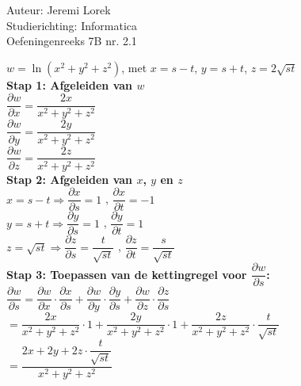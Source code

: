 \documentclass[a4paper]{article}
\begin{document}
\noindent \large Auteur: Jeremi Lorek\\
\noindent \large Studierichting: Informatica\\
\noindent \large Oefeningenreeks 7B nr. 2.1\\

\medskip
\normalsize

$w = \ln(x^2 + y^2 + z^2)$, met $x = s - t$, $y = s + t$, $z = 2\sqrt{st}$\\

\textbf{Stap 1: Afgeleiden van $w$}\\

$\dfrac{\partial w}{\partial x} = \dfrac{2x}{x^2 + y^2 + z^2}$\\

$\dfrac{\partial w}{\partial y} = \dfrac{2y}{x^2 + y^2 + z^2}$\\

$\dfrac{\partial w}{\partial z} = \dfrac{2z}{x^2 + y^2 + z^2}$\\

\textbf{Stap 2: Afgeleiden van $x$, $y$ en $z$}\\

$x = s - t \Rightarrow \dfrac{\partial x}{\partial s} = 1$ , $\dfrac{\partial x}{\partial t} = -1$\\

$y = s + t \Rightarrow \dfrac{\partial y}{\partial s} = 1$ , $\dfrac{\partial y}{\partial t} = 1$\\

$z = \sqrt{st} \Rightarrow \dfrac{\partial z}{\partial s} = \dfrac{t}{\sqrt{st}}$ , $\dfrac{\partial z}{\partial t} = \dfrac{s}{\sqrt{st}}$ \\


\textbf{Stap 3: Toepassen van de kettingregel voor $\dfrac{\partial w}{\partial s}$:}\\

$\dfrac{\partial w}{\partial s} = \dfrac{\partial w}{\partial x} \cdot \dfrac{\partial x}{\partial s} + \dfrac{\partial w}{\partial y} \cdot \dfrac{\partial y}{\partial s} + \dfrac{\partial w}{\partial z} \cdot \dfrac{\partial z}{\partial s}$\\

$= \dfrac{2x}{x^2 + y^2 + z^2} \cdot 1 + \dfrac{2y}{x^2 + y^2 + z^2} \cdot 1 + \dfrac{2z}{x^2 + y^2 + z^2} \cdot \dfrac{t}{\sqrt{st}}$\\

$= \dfrac{2x + 2y + 2z \cdot \dfrac{t}{\sqrt{st}}}{x^2 + y^2 + z^2}$\\
\end{document}
